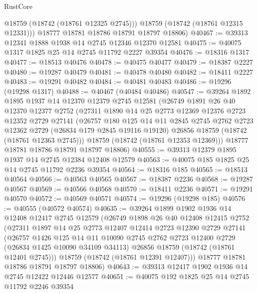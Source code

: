 \begin{lexlean}{RustCore}
\begin{coremodule}
          @18759
          (@18742 (@18761 @12325 @2745)))
        @18759
        (@18742 (@18761 @12315 @12331)))
      @18777
      @18781
      @18786
      @18791
      @18797
      @18806)
@40467 := @39313 @12341 @1888 @1938 @14 @2745 @12346 @12370 @12581
@40475 := @40075 @1317 @1825 @25 @14 @2745 @11792 @2227 @39354
@40476 := @18316 @1317
@40477 := @18513 @40476
@40478 := @40475 @40477
@40479 := @18387 @2227
@40480 := @19287 @40479
@40481 := @40478 @40480
@40482 := @18411 @2227
@40483 := @19291 @40482
@40484 := @40481 @40483
@40486 := @19296 (@19298 @1317)
@40488 := @40467 (@40484 @40486)
@40547 := @39264
    @1892
    @1895
    @1937
    @14
    @12370
    @12379
    @2745
    @12581
    (@26749
      @1891
      @26
      @40
      @12370
      @12377
      @2752
      (@27311
        @1890
        @14
        @25
        @2773
        @12369
        @12376
        @2723
        @12352
        @2729
        @27141
        (@26757
          @180
          @125
          @14
          @11
          @2845
          @2745
          @2762
          @2723
          @12362
          @2729
          (@26834 @179 @2845 @19116 @19120)
          @26856
          @18759
          (@18742 (@18761 @12363 @2745)))
        @18759
        (@18742 (@18761 @12353 @12369)))
      @18777
      @18781
      @18786
      @18791
      @18797
      @18806)
@40555 := @39313 @12379 @1895 @1937 @14 @2745 @12384 @12408 @12579
@40563 := @40075 @185 @1825 @25 @14 @2745 @11792 @2236 @39354
@40564 := @18316 @185
@40565 := @18513 @40564
@40566 := @40563 @40565
@40567 := @18387 @2236
@40568 := @19287 @40567
@40569 := @40566 @40568
@40570 := @18411 @2236
@40571 := @19291 @40570
@40572 := @40569 @40571
@40574 := @19296 (@19298 @185)
@40576 := @40555 (@40572 @40574)
@40635 := @39264
    @1899
    @1902
    @1936
    @14
    @12408
    @12417
    @2745
    @12579
    (@26749
      @1898
      @26
      @40
      @12408
      @12415
      @2752
      (@27311
        @1897
        @14
        @25
        @2773
        @12407
        @12414
        @2723
        @12390
        @2729
        @27141
        (@26757
          @1426
          @125
          @14
          @11
          @10090
          @2745
          @2762
          @2723
          @12400
          @2729
          (@26834 @1425 @10090 @34109 @34113)
          @26856
          @18759
          (@18742 (@18761 @12401 @2745)))
        @18759
        (@18742 (@18761 @12391 @12407)))
      @18777
      @18781
      @18786
      @18791
      @18797
      @18806)
@40643 := @39313 @12417 @1902 @1936 @14 @2745 @12422 @12446 @12577
@40651 := @40075 @192 @1825 @25 @14 @2745 @11792 @2246 @39354

\end{coremodule}
\end{lexlean}
